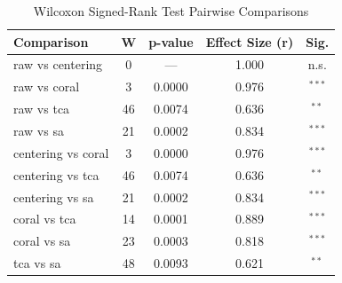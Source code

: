 \begin{table}[htbp]
\centering
\caption{Wilcoxon Signed-Rank Test Pairwise Comparisons}
\label{tab:wilcoxon}
\begin{tabular}{lcccc}
\toprule
Comparison & W & p-value & Effect Size (r) & Sig. \\
\midrule
raw vs centering & 0 & — & 1.000 & n.s. \\
raw vs coral & 3 & 0.0000 & 0.976 & $^{***}$ \\
raw vs tca & 46 & 0.0074 & 0.636 & $^{**}$ \\
raw vs sa & 21 & 0.0002 & 0.834 & $^{***}$ \\
centering vs coral & 3 & 0.0000 & 0.976 & $^{***}$ \\
centering vs tca & 46 & 0.0074 & 0.636 & $^{**}$ \\
centering vs sa & 21 & 0.0002 & 0.834 & $^{***}$ \\
coral vs tca & 14 & 0.0001 & 0.889 & $^{***}$ \\
coral vs sa & 23 & 0.0003 & 0.818 & $^{***}$ \\
tca vs sa & 48 & 0.0093 & 0.621 & $^{**}$ \\
\bottomrule
\end{tabular}
\end{table}